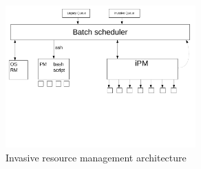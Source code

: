 \documentclass[a4paper, 12pt]{article}
\begin{document}
\begin{figure}[h]
\centering
\includegraphics[width=0.65\textwidth, clip, trim=0mm 60mm 0mm 0mm]{data/architecture.pdf}
\vspace{-0.15in}
\caption{Invasive resource management architecture}
\label{fig:arch}
\end{figure}
\end{document}
